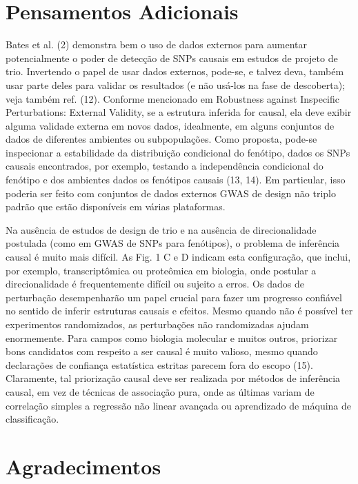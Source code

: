 \section*{Pensamentos Adicionais}

    Bates et al. (2) demonstra bem o uso de dados externos para aumentar potencialmente o poder de detecção de SNPs causais em estudos de projeto de trio. Invertendo o papel de usar dados externos, pode-se, e talvez deva, também usar parte deles para validar os resultados (e não usá-los na fase de descoberta); veja também ref. (12). Conforme mencionado em Robustness against Inspecific Perturbations: External Validity, se a estrutura inferida for causal, ela deve exibir alguma validade externa em novos dados, idealmente, em alguns conjuntos de dados de diferentes ambientes ou subpopulações. Como proposta, pode-se inspecionar a estabilidade da distribuição condicional do fenótipo, dados os SNPs causais encontrados, por exemplo, testando a independência condicional do fenótipo e dos ambientes dados os fenótipos causais (13, 14). Em particular, isso poderia ser feito com conjuntos de dados externos GWAS de design não triplo padrão que estão disponíveis em várias plataformas.

    Na ausência de estudos de design de trio e na ausência de direcionalidade postulada (como em GWAS de SNPs para fenótipos), o problema de inferência causal é muito mais difícil. As Fig. 1 C e D indicam esta configuração, que inclui, por exemplo, transcriptômica ou proteômica em biologia, onde postular a direcionalidade é frequentemente difícil ou sujeito a erros. Os dados de perturbação desempenharão um papel crucial para fazer um progresso confiável no sentido de inferir estruturas causais e efeitos. Mesmo quando não é possível ter experimentos randomizados, as perturbações não randomizadas ajudam enormemente. Para campos como biologia molecular e muitos outros, priorizar bons candidatos com respeito a ser causal é muito valioso, mesmo quando declarações de confiança estatística estritas parecem fora do escopo (15). Claramente, tal priorização causal deve ser realizada por métodos de inferência causal, em vez de técnicas de associação pura, onde as últimas variam de correlação simples a regressão não linear avançada ou aprendizado de máquina de classificação.
    
\section*{Agradecimentos}

